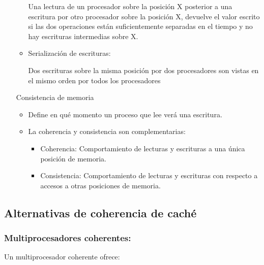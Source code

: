 \documentclass[12pt, twoside, openright]{report} %
\begin{document}
\begin{itemize}
\begin{itemize}
        

        Una lectura de un procesador sobre la posición X posterior a
          una escritura por otro procesador sobre la posición X,
          devuelve el valor escrito si las dos operaciones están
          suficientemente separadas en el tiempo y no hay escrituras
          intermedias sobre X.

          \item
        Serialización de escrituras:


        

        Dos escrituras sobre la misma posición por dos procesadores
          son vistas en el mismo orden por todos los procesadores

        \end{itemize}

        Consistencia de memoria

      \begin{itemize}
      
      \item
        Define en qué momento un proceso que lee verá una escritura.
      \item
        La coherencia y consistencia son complementarias:
        \begin{itemize}
          \item Coherencia: Comportamiento de lecturas y escrituras a una
          única posición de memoria.

          \item Consistencia: Comportamiento de lecturas y escrituras con
          respecto a accesos a otras posiciones de memoria.
        \end{itemize}

        

        
        \end{itemize}
      \end{itemize}

      
\subsection{Alternativas de coherencia de caché}
\subsubsection{Multiprocesadores coherentes:}

 

      Un multiprocesador coherente ofrece:
\end{document}
